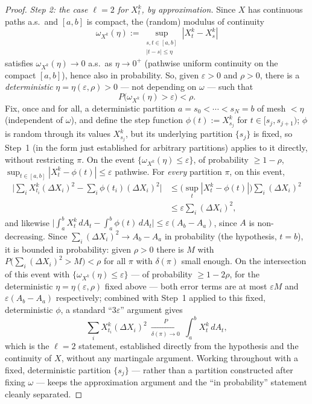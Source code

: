 \documentclass[10pt,a4paper]{amsart}
\newcommand{\eps}{\varepsilon}
\begin{document}
\begin{proof}
\medskip\noindent\textit{Step 2: the case $\ell=2$ for $X_t^k$, by
approximation.} Since $X$ has continuous paths a.s.\ and $[a,b]$ is
compact, the (random) modulus of continuity
\[
\omega_{X^k}(\eta):=\sup_{\substack{s,t\in[a,b]\\|t-s|\le\eta}}|X_t^k-X_s^k|
\]
satisfies $\omega_{X^k}(\eta)\to0$ a.s.\ as $\eta\to0^+$ (pathwise
uniform continuity on the compact $[a,b]$), hence also in probability.
So, given $\eps>0$ and $\rho>0$, there is a \emph{deterministic}
$\eta=\eta(\eps,\rho)>0$ --- not depending on $\omega$ --- such that
\[
P\big(\omega_{X^k}(\eta)>\eps\big)<\rho.
\]
Fix, once and for all, a deterministic partition $a=s_0<\cdots<s_N=b$ of
mesh $<\eta$ (independent of $\omega$), and define the step function
$\phi(t):=X_{s_j}^k$ for $t\in[s_j,s_{j+1})$; $\phi$ is random through
its values $X_{s_j}^k$, but its underlying partition $\{s_j\}$ is fixed,
so Step~1 (in the form just established for arbitrary partitions)
applies to it directly, without restricting $\pi$. On the event
$\{\omega_{X^k}(\eta)\le\eps\}$, of probability $\ge1-\rho$,
$\sup_{t\in[a,b]}|X_t^k-\phi(t)|\le\eps$ pathwise. For \emph{every}
partition $\pi$, on this event,
\begin{align*}
\Big|\sum_iX_{t_i}^k(\Delta X_i)^2-\sum_i\phi(t_i)(\Delta X_i)^2\Big|
&\le\Big(\sup_t|X_t^k-\phi(t)|\Big)\sum_i(\Delta X_i)^2\\
&\le\eps\sum_i(\Delta X_i)^2,
\end{align*}
and likewise $\big|\int_a^bX_t^k\,dA_t-\int_a^b\phi(t)\,dA_t\big|
\le\eps(A_b-A_a)$, since $A$ is non-decreasing. Since $\sum_i(\Delta
X_i)^2\to A_b-A_a$ in probability (the hypothesis, $t=b$), it is bounded
in probability: given $\rho>0$ there is $M$ with
$P\big(\sum_i(\Delta X_i)^2>M\big)<\rho$ for all $\pi$ with $\delta(\pi)$
small enough. On the intersection of this event with
$\{\omega_{X^k}(\eta)\le\eps\}$ --- of probability $\ge1-2\rho$, for the
deterministic $\eta=\eta(\eps,\rho)$ fixed above --- both error terms are
at most $\eps M$ and $\eps(A_b-A_a)$ respectively; combined with Step~1
applied to this fixed, deterministic $\phi$, a standard ``$3\eps$''
argument gives
\[
\sum_iX_{t_i}^k(\Delta X_i)^2\ \xrightarrow[\delta(\pi)\to0]{P}\ \int_a^bX_t^k\,dA_t,
\]
which is the $\ell=2$ statement, established directly from the hypothesis
and the continuity of $X$, without any martingale argument. Working
throughout with a fixed, deterministic partition $\{s_j\}$ --- rather
than a partition constructed after fixing $\omega$ --- keeps the
approximation argument and the ``in probability'' statement cleanly
separated.


\end{proof}
\end{document}
